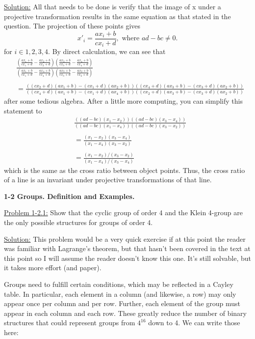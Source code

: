 \documentclass[12pt]{article}
\begin{document}
\underline{Solution:} All that needs to be done is verify that the image of x
under a projective transformation results in the same equation as that stated
in the question. The projection of these points gives
\[
    x'_i = \frac{ax_i+b}{cx_i+d}, \text{ where } ad-bc \neq 0.
\]
for $i \in {1,2,3,4}$. By direct calculation, we can see that
\begin{align*}
    & \frac{\left(\frac{ax_1 + b}{cx_1 + d} - \frac{ax_2 + b}{cx_2 + d}\right)
    \left( \frac{ax_3 + b}{cx_3 + d} - \frac{ax_4 + b}{cx_4 + d}\right)}
    {\left(\frac{ax_1 + b}{cx_1 + d} - \frac{ax_4 + b}{cx_4 + d}\right)    
    \left( \frac{ax_3 + b}{cx_3 + d} - \frac{ax_2 + b}{cx_2 + d}\right)}\\
    \\
    &=
    \frac{((cx_2+d)(ax_1+b)-(cx_1+d)(ax_2+b))((cx_4+d)(ax_3+b)-(cx_3+d)(ax_2+b))}
      {((cx_4+d)(ax_1+b)-(cx_1+d)(ax_4+b))((cx_2+d)(ax_3+b)-(cx_3+d)(ax_2+b))}
\end{align*}
after some tedious algebra. After a little more computing, you can simplify
this statement to
\begin{align*}
    & \frac{((ad-bc)(x_1-x_2))((ad-bc)(x_3-x_4))}{((ad-bc)(x_1-x_4))((ad-bc)(x_3-x_2))}\\
    \\
    & = \frac{(x_1 - x_2)(x_3 - x_4)}{(x_1-x_4)(x_3-x_2)}\\
    \\
    & = \frac{(x_1 - x_2)/(x_3 - x_2)}{(x_1-x_4)/(x_3-x_4)}
\end{align*}
which is the same as the cross ratio between object points. Thus, the cross
ratio of a line is an invariant under projective transformations of that line.

\textbf{1-2 Groups. Definition and Examples.}

\underline{Problem 1-2.1:} Show that the cyclic group of order 4 and the Klein
4-group are the only possible structures for groups of order 4.

\underline{Solution:} This problem would be a very quick exercise if at this
point the reader was familiar with Lagrange's theorem, but that hasn't been
covered in the text at this point so I will assume the reader doesn't know this
one. It's still solvable, but it takes more effort (and paper).

Groups need to fulfill certain conditions, which may be reflected in a Cayley
table. In particular, each element in a column (and likewise, a row) may only
appear once per column and per row. Further, each element of the group must
appear in each column and each row. These greatly reduce the number of binary
structures that could represent groups from $4^{16}$ down to 4. We can write
those here:
\end{document}
